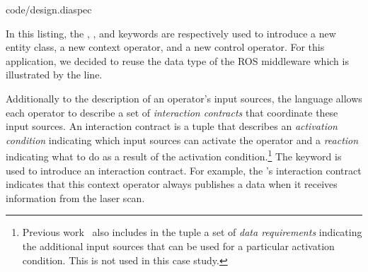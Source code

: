 %
{code/design.diaspec}

In this listing, the , , and 
keywords are respectively used to introduce a new entity class, a new
context operator, and a new control operator. For this application, we
decided to reuse the  data type of the ROS middleware which
is illustrated by the  line.

Additionally to the description of an operator's input sources, the
\diaspec{} language allows each operator to describe a set of
\emph{interaction contracts} that coordinate these input sources. An
interaction contract is a tuple that describes an \emph{activation
  condition} indicating which input sources can activate the operator
and a \emph{reaction} indicating what to do as a result of the
activation condition.\footnote{Previous work~\cite{Cass11a} also
  includes in the tuple a set of \emph{data requirements} indicating
  the additional input sources that can be used for a particular
  activation condition. This is not used in this case study.}
The  keyword is used to introduce an interaction
contract. For example, the 's interaction
contract indicates that this context operator always publishes a data
when it receives information from the laser scan.


